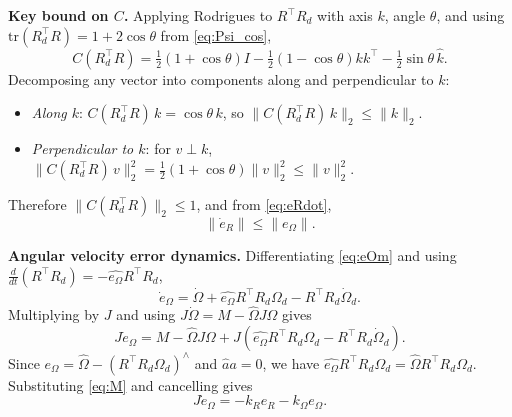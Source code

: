 \documentclass[11pt]{article}
\theoremstyle{remark}
\newcommand{\tr}{\mathrm{tr}}
\newcommand{\hatmap}[1]{\widehat{#1}}
\newcommand{\hatexp}[1]{({#1})^\wedge}
\begin{document}
\textbf{Key bound on $C$.} Applying Rodrigues to $R^\top R_d$ with axis $k$, angle $\theta$, and using $\tr(R_d^\top R) = 1+2\cos\theta$ from \eqref{eq:Psi_cos},
\[
C(R_d^\top R) = \tfrac{1}{2}(1+\cos\theta)I - \tfrac{1}{2}(1-\cos\theta)kk^\top - \tfrac{1}{2}\sin\theta\,\hatmap{k}.
\]
Decomposing any vector into components along and perpendicular to $k$:
\begin{itemize}
    \item \textit{Along $k$}: $C(R_d^\top R)\,k = \cos\theta\,k$, so $\|C(R_d^\top R)\,k\|_2 \le \|k\|_2$.
    \item \textit{Perpendicular to $k$}: for $v\perp k$, $\|C(R_d^\top R)\,v\|_2^2 = \tfrac{1}{2}(1+\cos\theta)\|v\|_2^2 \le \|v\|_2^2$.
\end{itemize}
Therefore $\|C(R_d^\top R)\|_2 \leq 1$, and from \eqref{eq:eRdot},
\begin{equation}
\|\dot{e}_R\| \leq \|e_\Omega\|.
\label{eq:eRdot_bound}
\end{equation}

\textbf{Angular velocity error dynamics.} Differentiating \eqref{eq:eOm} and using $\tfrac{d}{dt}(R^\top R_d) = -\hatmap{e_\Omega}R^\top R_d$,
\[
\dot{e}_\Omega = \dot{\Omega} + \hatmap{e_\Omega}R^\top R_d\Omega_d - R^\top R_d\dot{\Omega}_d.
\]
Multiplying by $J$ and using $J\dot{\Omega} = M - \hatmap{\Omega}J\Omega$ gives
\[
J\dot{e}_\Omega = M - \hatmap{\Omega}J\Omega + J(\hatmap{e_\Omega}R^\top R_d\Omega_d - R^\top R_d\dot{\Omega}_d).
\]
Since $\hatmap{e_\Omega} = \hatmap{\Omega} - \hatexp{R^\top R_d\Omega_d}$ and $\hatmap{a}a=0$, we have $\hatmap{e_\Omega}R^\top R_d\Omega_d = \hatmap{\Omega}R^\top R_d\Omega_d$. Substituting \eqref{eq:M} and cancelling gives
\begin{equation}
J\dot{e}_\Omega = -k_R e_R - k_\Omega e_\Omega.
\label{eq:eOmdot}
\end{equation}
\end{document}
